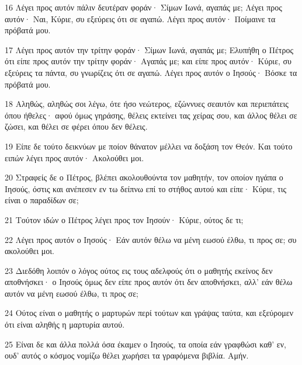 \par 16 Λέγει προς αυτόν πάλιν δευτέραν φοράν· Σίμων Ιωνά, αγαπάς με; Λέγει προς αυτόν· Ναι, Κύριε, συ εξεύρεις ότι σε αγαπώ. Λέγει προς αυτόν· Ποίμαινε τα πρόβατά μου.
\par 17 Λέγει προς αυτόν την τρίτην φοράν· Σίμων Ιωνά, αγαπάς με; Ελυπήθη ο Πέτρος ότι είπε προς αυτόν την τρίτην φοράν· Αγαπάς με; και είπε προς αυτόν· Κύριε, συ εξεύρεις τα πάντα, συ γνωρίζεις ότι σε αγαπώ. Λέγει προς αυτόν ο Ιησούς· Βόσκε τα πρόβατά μου.
\par 18 Αληθώς, αληθώς σοι λέγω, ότε ήσο νεώτερος, εζώννυες σεαυτόν και περιεπάτεις όπου ήθελες· αφού όμως γηράσης, θέλεις εκτείνει τας χείρας σου, και άλλος θέλει σε ζώσει, και θέλει σε φέρει όπου δεν θέλεις.
\par 19 Είπε δε τούτο δεικνύων με ποίον θάνατον μέλλει να δοξάση τον Θεόν. Και τούτο ειπών λέγει προς αυτόν· Ακολούθει μοι.
\par 20 Στραφείς δε ο Πέτρος, βλέπει ακολουθούντα τον μαθητήν, τον οποίον ηγάπα ο Ιησούς, όστις και ανέπεσεν εν τω δείπνω επί το στήθος αυτού και είπε· Κύριε, τις είναι ο παραδίδων σε;
\par 21 Τούτον ιδών ο Πέτρος λέγει προς τον Ιησούν· Κύριε, ούτος δε τι;
\par 22 Λέγει προς αυτόν ο Ιησούς· Εάν αυτόν θέλω να μένη εωσού έλθω, τι προς σε; συ ακολούθει μοι.
\par 23 Διεδόθη λοιπόν ο λόγος ούτος εις τους αδελφούς ότι ο μαθητής εκείνος δεν αποθνήσκει· ο Ιησούς όμως δεν είπε προς αυτόν ότι δεν αποθνήσκει, αλλ' εάν θέλω αυτόν να μένη εωσού έλθω, τι προς σε;
\par 24 Ούτος είναι ο μαθητής ο μαρτυρών περί τούτων και γράψας ταύτα, και εξεύρομεν ότι είναι αληθής η μαρτυρία αυτού.
\par 25 Είναι δε και άλλα πολλά όσα έκαμεν ο Ιησούς, τα οποία εάν γραφθώσι καθ' εν, ουδ' αυτός ο κόσμος νομίζω θέλει χωρήσει τα γραφόμενα βιβλία. Αμήν.



